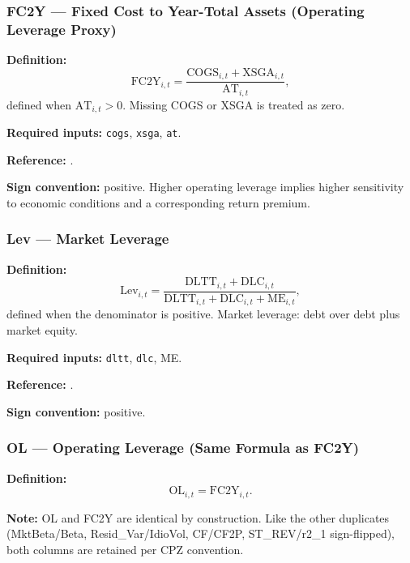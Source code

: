 \subsubsection{FC2Y --- Fixed Cost to Year-Total Assets (Operating Leverage Proxy)}

\textbf{Definition:}
\begin{equation}
\mathrm{FC2Y}_{i,t} = \frac{\mathrm{COGS}_{i,t} + \mathrm{XSGA}_{i,t}}
                            {\mathrm{AT}_{i,t}},
\label{eq:fc2y}
\end{equation}
defined when $\mathrm{AT}_{i,t} > 0$. Missing COGS or XSGA is treated
as zero.

\textbf{Required inputs:} \texttt{cogs}, \texttt{xsga}, \texttt{at}.

\textbf{Reference:} \cite{NovyMarx2011}.

\textbf{Sign convention:} positive. Higher operating leverage implies
higher sensitivity to economic conditions and a corresponding return
premium.

\subsubsection{Lev --- Market Leverage}

\textbf{Definition:}
\begin{equation}
\mathrm{Lev}_{i,t} = \frac{\mathrm{DLTT}_{i,t} + \mathrm{DLC}_{i,t}}
                          {\mathrm{DLTT}_{i,t} + \mathrm{DLC}_{i,t} + \mathrm{ME}_{i,t}},
\label{eq:lev}
\end{equation}
defined when the denominator is positive. Market leverage: debt over
debt plus market equity.

\textbf{Required inputs:} \texttt{dltt}, \texttt{dlc}, ME.

\textbf{Reference:} \cite{FamaFrench1992}.

\textbf{Sign convention:} positive.

\subsubsection{OL --- Operating Leverage (Same Formula as FC2Y)}

\textbf{Definition:}
\begin{equation}
\mathrm{OL}_{i,t} = \mathrm{FC2Y}_{i,t}.
\label{eq:ol}
\end{equation}

\textbf{Note:} OL and FC2Y are identical by construction. Like the
other duplicates (MktBeta/Beta, Resid\_Var/IdioVol, CF/CF2P, ST\_REV/r2\_1
sign-flipped), both columns are retained per CPZ convention.

